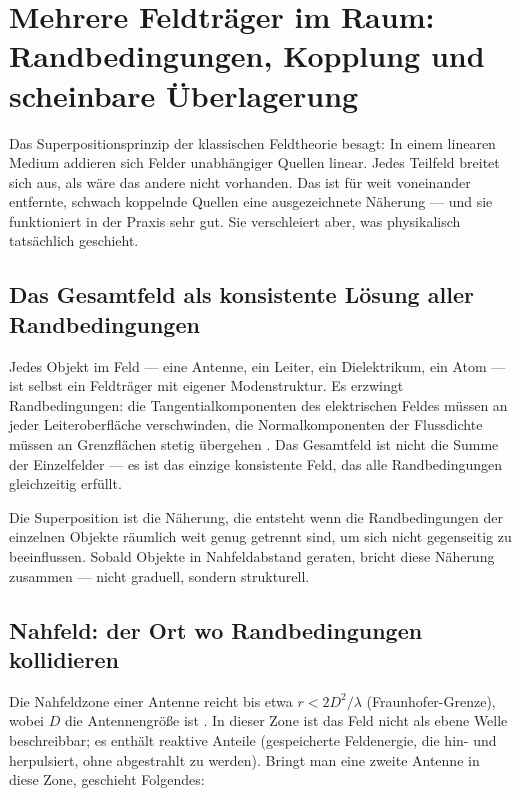 \section{Mehrere Feldträger im Raum: Randbedingungen, Kopplung und scheinbare Überlagerung}

Das Superpositionsprinzip der klassischen Feldtheorie besagt: In einem linearen
Medium addieren sich Felder unabhängiger Quellen linear. Jedes Teilfeld breitet
sich aus, als wäre das andere nicht vorhanden. Das ist für weit voneinander
entfernte, schwach koppelnde Quellen eine ausgezeichnete Näherung --- und sie
funktioniert in der Praxis sehr gut. Sie verschleiert aber, was physikalisch
tatsächlich geschieht.

\subsection*{Das Gesamtfeld als konsistente Lösung aller Randbedingungen}

Jedes Objekt im Feld --- eine Antenne, ein Leiter, ein Dielektrikum, ein Atom
--- ist selbst ein Feldträger mit eigener Modenstruktur. Es erzwingt
Randbedingungen: die Tangentialkomponenten des elektrischen Feldes müssen
an jeder Leiteroberfläche verschwinden, die Normalkomponenten der
Flussdichte müssen an Grenzflächen stetig übergehen \EM. Das Gesamtfeld
ist nicht die Summe der Einzelfelder --- es ist das einzige konsistente
Feld, das alle Randbedingungen gleichzeitig erfüllt.

Die Superposition ist die Näherung, die entsteht wenn die Randbedingungen
der einzelnen Objekte räumlich weit genug getrennt sind, um sich nicht
gegenseitig zu beeinflussen. Sobald Objekte in Nahfeldabstand geraten,
bricht diese Näherung zusammen --- nicht graduell, sondern strukturell.

\subsection*{Nahfeld: der Ort wo Randbedingungen kollidieren}

Die Nahfeldzone einer Antenne reicht bis etwa $r < 2D^2/\lambda$
(Fraunhofer-Grenze), wobei $D$ die Antennengröße ist \EM. In dieser Zone
ist das Feld nicht als ebene Welle beschreibbar; es enthält reaktive
Anteile (gespeicherte Feldenergie, die hin- und herpulsiert, ohne
abgestrahlt zu werden). Bringt man eine zweite Antenne in diese Zone,
geschieht Folgendes:

